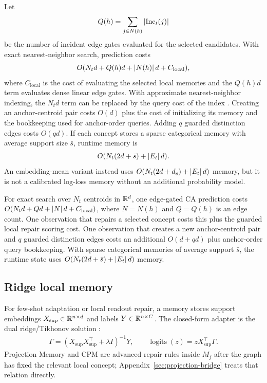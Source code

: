 Let
\begin{align*}
Q(h)=\sum_{j\in N(h)}\left\lvert\operatorname{Inc}_t(j)\right\rvert
\end{align*}
be the number of incident edge gates evaluated for the selected candidates. With exact nearest-neighbor search, prediction costs
\begin{align*}
O(N_td+Q(h)d+\left\lvert N(h)\right\rvert d+C_{\mathrm{local}}),
\end{align*}
where $C_{\mathrm{local}}$ is the cost of evaluating the selected local memories and the $Q(h)d$ term evaluates dense linear edge gates. With approximate nearest-neighbor indexing, the $N_td$ term can be replaced by the query cost of the index \citep{indyk1998approximate,johnson2019billion}. Creating an anchor-centroid pair costs $O(d)$ plus the cost of initializing its memory and the bookkeeping used for anchor-order queries. Adding $q$ guarded distinction edges costs $O(qd)$. If each concept stores a sparse categorical memory with average support size $\bar s$, runtime memory is
\begin{align*}
O(N_t(2d+\bar s)+\left\lvert E_t\right\rvert d).
\end{align*}
An embedding-mean variant instead uses $O(N_t(2d+d_e)+\left\lvert E_t\right\rvert d)$ memory, but it is not a calibrated log-loss memory without an additional probability model.

\begin{theorem}
\label{thm:dgm-complexity:informal}
For exact search over $N_t$ centroids in $\mathbb{R}^d$, one edge-gated CA prediction costs $O(N_td+Q d+\left\lvert N\right\rvert d+C_{\mathrm{local}})$, where $N=N(h)$ and $Q=Q(h)$ is an edge count. One observation that repairs a selected concept costs this plus the guarded local repair scoring cost. One observation that creates a new anchor-centroid pair and $q$ guarded distinction edges costs an additional $O(d+qd)$ plus anchor-order query bookkeeping. With sparse categorical memories of average support $\bar s$, the runtime state uses $O(N_t(2d+\bar s)+\left\lvert E_t\right\rvert d)$ memory.
\end{theorem}

\subsection{Ridge local memory}

For few-shot adaptation or local readout repair, a memory stores support embeddings $X_{\mathrm{sup}}\in\mathbb{R}^{n\times d}$ and labels $Y\in\mathbb{R}^{n\times C}$. The closed-form adapter is the dual ridge/Tikhonov solution \citep{tikhonov1977solutions,hoerl1970ridge}:
\begin{align*}
\Gamma=(X_{\mathrm{sup}}X_{\mathrm{sup}}^\top+\lambda I)^{-1}Y,
\qquad
\operatorname{logits}(z)=zX_{\mathrm{sup}}^\top\Gamma.
\end{align*}
Projection Memory and CPM are advanced repair rules inside $M_j$ after the graph has fixed the relevant local concept; Appendix~\ref{sec:projection-bridge} treats that relation directly.


